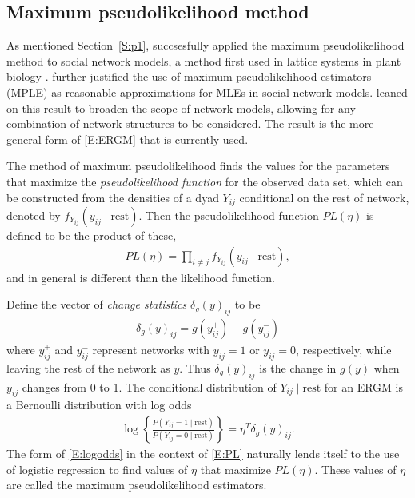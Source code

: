 \subsection{Maximum pseudolikelihood method} \label{S:pseudolikelihood}
As mentioned Section~\ref{S:p1}, \citet{Frank:1986} succsesfully applied 
the maximum pseudolikelihood method to social network models, a method first used in lattice systems in plant biology \citep{Besag:1974,Besag:1975}.  \citet{Strauss:1990} further justified the use of 
maximum pseudolikelihood estimators (MPLE) as reasonable approximations for MLEs in 
social network models.  \citet*{Wasserman:1996, Pattison:1999, logit} leaned on this 
result to broaden the scope of network models, allowing 
for any combination of network structures to be considered.  The result is the more general form of \eqref{E:ERGM} that is currently used.

The method of maximum pseudolikelihood finds the values for the parameters that 
maximize the \textit{pseudolikelihood function} for the observed 
data set, which can be constructed from the densities of a dyad $Y_{ij}$ 
conditional on the rest of network, denoted by $f_{Y_{ij}}( y_{ij} \mid \textrm{rest})$.
Then the pseudolikelihood function $PL(\eta)$ is defined to be the product of these,
\begin{align}
	PL(\eta) = \prod_{i \neq j}f_{Y_{ij}}( y_{ij} \mid \textrm{rest}), \label{E:PL}
\end{align}
and in general is different than the likelihood function.

Define the vector of \textit{change statistics} $\delta_g(y)_{ij}$ to be
\begin{align*}
	\delta_g(y)_{ij} = g(y_{ij}^+) - g(y_{ij}^-)
\end{align*}
where $y_{ij}^+$ and $y_{ij}^-$ represent networks with $y_{ij} = 1$ or $y_{ij} = 0$, 
respectively, while leaving the rest of the network as $y$.  Thus $\delta_g(y)_{ij}$ 
is the change in $g(y)$ when $y_{ij}$ changes from 0 to 1.
The conditional distribution of $Y_{ij} \mid \textrm{rest}$ for an ERGM is a Bernoulli 
distribution with log odds
\begin{align}
	\log \left \{ \frac{P( Y_{ij} =1 \mid \textrm{rest} ) }
				 	 { P( Y_{ij} =0 \mid \textrm{rest} ) } \right \} 
					 			= \eta^T \delta_g(y)_{ij}. \label{E:logodds}
\end{align}
The form of \eqref{E:logodds} in the context of \eqref{E:PL} naturally lends
itself to the use of logistic regression to find values of $\eta$ that
maximize $PL(\eta)$.  These values of $\eta$ are called the maximum pseudolikelihood estimators.

